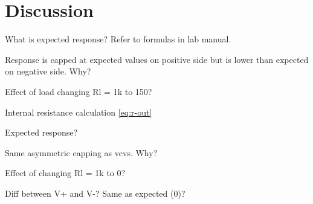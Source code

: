 \section{Discussion}\label{sec:discussion}
What is expected response? Refer to formulas in lab manual.

Response is capped at expected values on positive side but is lower than expected on negative side. Why?

Effect of load changing Rl = 1k to 150?

Internal resistance calculation \eqref{eq:r-out}

Expected response?

Same asymmetric capping as vcvs. Why?

Effect of changing Rl = 1k to 0?

Diff between  V+ and V-? Same as expected (0)?
